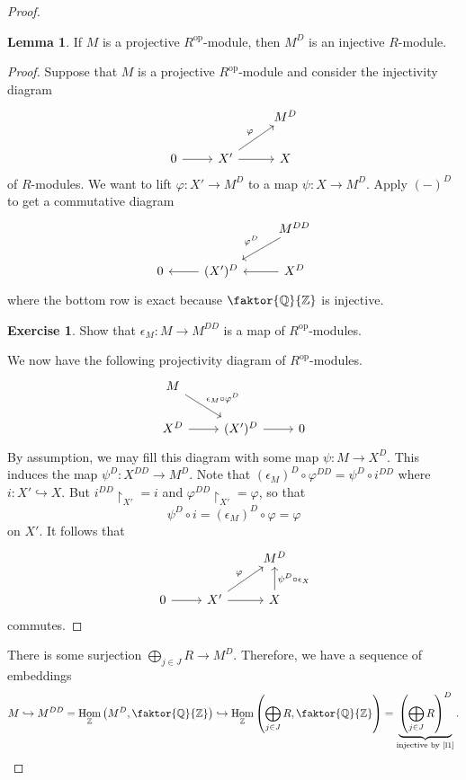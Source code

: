 \documentclass[10pt,letterpaper,cm]{nupset}
\theoremstyle{definition}
\theoremstyle{theorem}
\newtheorem{lemma}[definition]{Lemma}
\newtheorem{exercise}[definition]{Exercise}
\theoremstyle{remark}
\newcommand{\Q}{\mathbb Q}
\newcommand{\Z}{\mathbb Z}
\newcommand{\1}{\mathbf{1}}
\newcommand{\0}{\vec 0}
\DeclareMathOperator{\op}{op}
\DeclareMathOperator{\Hom}{Hom}
\begin{document}
\begin{proof}
\begin{lemma}\label{l1}
If $M$ is a projective $R^{\op}$-module, then $M^D$ is an injective $R$-module.
\end{lemma}
\begin{proof}
Suppose that $M$ is a projective $R^{\op}$-module and consider the injectivity diagram 
\[
\begin{tikzcd}
 &  & M^D \\
0 \arrow[r] & X' \arrow[r] \arrow[ru, "\varphi"] & X
\end{tikzcd}
\] of $R$-modules. We want to lift $\varphi : X' \to M^D$ to a map $\psi : X \to M^D$.  Apply $(-)^D$ to get a commutative diagram
\[
\begin{tikzcd}
 &  & M^{DD} \arrow[ld, "\varphi^D"'] \\
0 & (X')^D \arrow[l] & X^D \arrow[l]
\end{tikzcd}
\]
where the bottom row is exact because $\faktor{\Q}{\Z}$ is injective. 
\begin{exercise}                                                                                                  
Show that $\epsilon_M: M \to M^{DD}$ is a map of $R^{\op}$-modules.                                               
\end{exercise}   
We now have the following projectivity diagram of $R^{\op}$-modules.
\[
\begin{tikzcd}
M \arrow[rd, "\epsilon_M \circ \varphi^D"] &  &  \\
X^D \arrow[r] & (X')^D \arrow[r] & 0
\end{tikzcd}
\]
By assumption, we may fill this diagram with some map $\psi : M \to X^D$. This induces the map $\psi^D : X^{DD} \to M^D$. Note that $(\epsilon_M)^D \circ \varphi^{DD} = \psi^D \circ i^{DD}$ where $i : X' \hookrightarrow X$. But $i^{DD}\restriction_{X'} =i$ and $\varphi^{DD}\restriction_{X'} = \varphi$, so that $$\psi^D \circ i = (\epsilon_M)^D \circ  \varphi = \varphi$$ on $X'$. It follows that
\[
\begin{tikzcd}
 &  & M^D \\
0 \arrow[r] & X' \arrow[r] \arrow[ru, "\varphi"] & X \arrow[u, "\psi^D \circ \epsilon_X"']
\end{tikzcd}
\] commutes.
\end{proof}
There is some surjection $\bigoplus_{j\in J} R \to M^D$. Therefore, we have a sequence of embeddings $$M \hookrightarrow M^{DD} =\Hom_{\Z}\left(M^D, \faktor{\Q}{\Z} \right) \hookrightarrow \Hom_{\Z}\left(\bigoplus_{j\in J} R, \faktor{\Q}{\Z}\right) = \underbrace{\left(\bigoplus_{j\in J} R \right)^D}_{\text{injective by \cref{l1}}}.$$
\end{proof}
\end{document}
